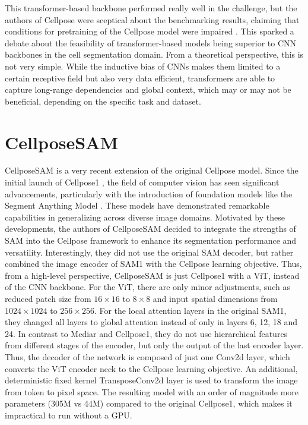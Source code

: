 This transformer-based backbone performed really well in the challenge, but the authors of Cellpose were sceptical about the benchmarking results, claiming that conditions for pretraining of the Cellpose model were impaired \cite{Stringer.2025}. This sparked a debate about the feasibility of transformer-based models being superior to CNN backbones in the cell segmentation domain. From a theoretical perspective, this is not very simple. While the inductive bias of CNNs makes them limited to a certain receptive field but also very data efficient, transformers are able to capture long-range dependencies and global context, which may or may not be beneficial, depending on the specific task and dataset.


\section{CellposeSAM}

CellposeSAM \cite{Pachitariu.2025} is a very recent extension of the original Cellpose model. Since the initial launch of Cellpose1 \cite{Stringer.2020}, the field of computer vision has seen significant advancements, particularly with the introduction of foundation models like the Segment Anything Model \cite{kirillov2023segment}. These models have demonstrated remarkable capabilities in generalizing across diverse image domains. Motivated by these developments, the authors of CellposeSAM decided to integrate the strengths of SAM into the Cellpose framework to enhance its segmentation performance and versatility. Interestingly, they did not use the original SAM decoder, but rather combined the image encoder of SAM1 with the Cellpose learning objective. Thus, from a high-level perspective, CellposeSAM is just Cellpose1 with a ViT, instead of the CNN backbone. For the ViT, there are only minor adjustments, such as reduced patch size from $16\times16$ to $8\times8$ and input spatial dimensions from $1024\times1024$ to $256\times256$. For the local attention layers in the original SAM1, they changed all layers to global attention instead of only in layers 6, 12, 18 and 24. In contrast to Mediar and Cellpose1, they do not use hierarchical features from different stages of the encoder, but only the output of the last encoder layer. Thus, the decoder of the network is composed of just one Conv2d layer, which converts the ViT encoder neck to the Cellpose learning objective. An additional, deterministic fixed kernel TransposeConv2d layer is used to transform the image from token to pixel space. The resulting model with an order of magnitude more parameters (305M vs 44M) compared to the original Cellpose1, which makes it impractical to run without a GPU. 

